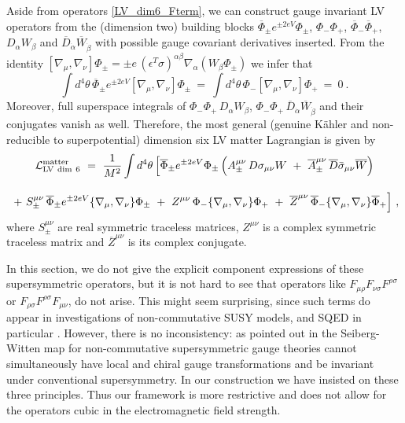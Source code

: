 \documentclass[12pt]{revtex4}
\begin{document}
Aside from operators \eqref{LV_dim6_Fterm}, we can 
construct gauge invariant LV operators from the (dimension two)
building blocks  
$\overline{\Phi}_\pm e^{\pm 2e V} \Phi_\pm$, $\Phi_- \Phi_+$, 
$\overline{\Phi}_- \overline{\Phi}_+$, $D_\alpha W_\beta$ and
$\overline{D}_{\dot\alpha} \overline{W}_{\dot\beta}$ with possible
gauge covariant derivatives inserted. From the identity 
\(
[ \nabla_\mu, \nabla_\nu] \Phi_\pm = \pm e \, 
(\epsilon^T \sigma)^{\alpha\beta} \nabla_\alpha( W_\beta \Phi_\pm)
\)
we infer that 
%
\begin{equation}
\int d^4\theta\, \overline{\Phi}_\pm e^{\pm 2eV} 
[ \nabla_\mu, \nabla_\nu] \Phi_\pm  
~=~ \int d^4\theta\, \Phi_- [ \nabla_\mu, \nabla_\nu] \Phi_+ ~=~ 0~. 
\end{equation} 
%
Moreover, full superspace integrals of 
$\Phi_- \Phi_+\, D_\alpha W_\beta$, 
$\Phi_- \Phi_+\, \overline{D}_{\dot\alpha} \overline{W}_{\dot\beta}$ 
and their conjugates vanish as well. Therefore, the most general
(genuine K\"ahler and non-reducible to superpotential) dimension six
LV matter Lagrangian is given by  
%
\begin{gather}
{\cal L}_{\rm LV\ dim\ 6}^{\rm matter}  ~=~ \frac{1}{M^2}
\int d^4 \theta\, \Big[ 
\overline{\Phi}_\pm e^{\pm 2eV} \Phi_\pm \, 
\Big( 
A_\pm^{\mu\nu} \, D \sigma_{\mu\nu} W ~+~ 
\overline{A}_\pm^{\mu\nu} \, \overline{D} \bar\sigma_{\mu\nu} \overline{W}
\Big) 
\nonumber \\[2ex]
~+~ S_\pm^{\mu\nu}\,  \overline{\Phi}_\pm e^{\pm 2eV} 
\lbrace \nabla_\mu, \nabla_\nu \rbrace \Phi_\pm  
~+~ Z^{\mu\nu}\,  \Phi_- \lbrace \nabla_\mu, \nabla_\nu \rbrace \Phi_+ 
~+~ \overline{Z}^{\mu\nu}\,  
\overline{\Phi}_- \lbrace \nabla_\mu, \nabla_\nu \rbrace \overline{\Phi}_+ 
 \Big]~, 
 \label{LV_dim6_Dterm}
\end{gather}
%
where $S_\pm^{\mu\nu}$ are real symmetric traceless matrices, 
$Z^{\mu\nu}$ is a complex symmetric traceless matrix and
$\overline{Z}^{\mu\nu}$ is its complex conjugate. 


In this section, we do not give the explicit component expressions of
these supersymmetric operators, but it is not hard to see that
operators like  $ F_{\mu\rho}F_{\nu\sigma}F^{\rho\sigma} $
or $ F_{\rho\sigma}F^{\rho\sigma}F_{\mu\nu} $, 
do not arise. This might seem surprising, since such terms do appear
in investigations of non-commutative SUSY models, and SQED in
particular \cite{Putz:2002ib,Mikulovic:2003sq}. However, there is no
inconsistency: as pointed out in \cite{Mikulovic:2003sq} the
Seiberg-Witten map for non-commutative supersymmetric gauge 
theories cannot simultaneously have local and chiral gauge
transformations and be invariant under conventional supersymmetry. 
In our construction we have insisted on these three
principles. 
Thus our framework is more restrictive and does not allow 
for the operators cubic in the electromagnetic field strength.
\end{document}
